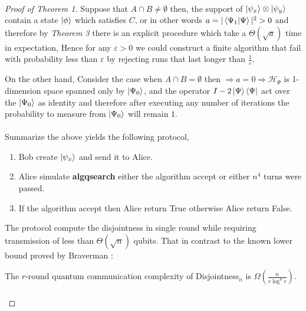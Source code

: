 \documentclass{article}
\begin{document}
\paragraph{} 

\begin{proof}[Proof of Theorem 1]
Suppose that \( A \cap B \neq \emptyset \) then, the support of \( \ket{\psi_x} \otimes \ket{\psi_y} \) contain a state \( \ket{\phi} \) which satisfies \(C\), or in other words $a = |\braket{\Psi_1|\Psi}|^2 > 0 $ and therefore by \textit{Theorem 3} there is an explicit procedure which take a $\Theta(\sqrt{a})$ time in expectation, Hence for any \(\varepsilon >0\) we could construct a finite algorithm that fail with probability less than $ \varepsilon $ by rejecting runs that last longer than $\frac{1}{\varepsilon}$. 
  
On the other hand, Consider the case when \(A \cap B = \emptyset\) then $\Rightarrow a = 0 \Rightarrow \mathcal{H}_{\Psi}$ is 1-dimension space spanned only by $\ket{\Psi_0} $, and the operator $ I - 2 \ket{\Psi}\bra{\Psi} $ act over the $ \ket{\Psi_0}  $ as identity and therefore after executing any number of iterations the probability to measure from $\ket{\Psi_0}$ will remain $1$.

\paragraph{}Summarize the above yields the following protocol,
\begin{enumerate}
    \item Bob create \( \ket{\psi_x} \) and send it to Alice.
    \item Alice simulate \textbf{algqsearch} either the algorithm accept or either $n^4$ turns were passed.     
    \item If the algorithm accept then Alice return True otherwise Alice return False. 
\end{enumerate}

The protocol compute the disjointness in single round while requiring transmission of less than $\Theta\left( \sqrt{n} \right)$ qubits. That in contrast to the known lower bound proved by Braverman \cite{Braverman}: 
\begin{theorem*}[Theorem A] The $r$-round quantum communication complexity of Disjointness$_n$ is $ \Omega\left( \frac{n}{r \log^8 r} \right)$.
\end{theorem*}
\paragraph{}
\end{proof}
\end{document}
